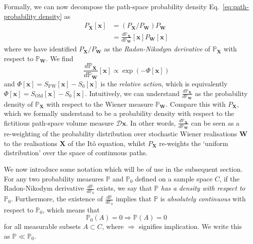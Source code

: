 Formally, we can now decompose the path-space probability density Eq.~\ref{eq:path-probability density} as
\begin{equation}
\begin{aligned}
P_\mathbf{X}[\mathbf{x}] & = (P_\mathbf{X} / P_\mathbf{W}) P_\mathbf{W}   \\
 & = \frac{d \mathbb{P}_\mathbf{X}}{d \mathbb{P}_\mathbf{W}}[\mathbf{x}] P_\mathbf{W}[\mathbf{x}]
\end{aligned}
\end{equation}
where we have identified $P_\mathbf{X} / P_\mathbf{W}$ as the \textit{Radon-Nikodym derivative} of $\mathbb{P}_\mathbf{X}$ with respect to $\mathbb{P}_\mathbf{W}$. We find
\begin{equation} \label{eq:radon-nikodym derivative of Px}
\frac{d \mathbb{P}_\mathbf{X}}{d \mathbb{P}_\mathbf{W}}[\mathbf{x}] \propto \exp ( -\Phi[\mathbf{x}] )
\end{equation}
and $\Phi[\mathbf{x}] = S_\text{FW}[\mathbf{x}] - S_0[\mathbf{x}]$ is the \textit{relative action}, which is equivalently $\Phi[\mathbf{x}] = S_\text{OM}[\mathbf{x}] - S_0[\mathbf{x}]$. Intuitively, we can understand $\frac{d \mathbb{P}_\mathbf{X}}{d \mathbb{P}_\mathbf{W}}$ as the probability density of $\mathbb{P}_\mathbf{X}$ with respect to the Wiener measure $\mathbb{P}_\mathbf{W}$. Compare this with $P_\mathbf{X}$, which we formally understand to be a probability density with respect to the fictitious path-space volume measure $\mathcal{D} \mathbf{x}$. In other words, $\frac{d \mathbb{P}_\mathbf{X}}{d \mathbb{P}_\mathbf{W}}$ can be seen as a re-weighting of the probability distribution over stochastic Wiener realisations $\mathbf{W}$ to the realisations $\mathbf{X}$ of the It\^{o} equation, whilst $P_\mathbf{X}$ re-weights the `uniform distribution' over the space of continuous paths.

We now introduce some notation which will be of use in the subsequent section. For any two probability measures $\mathbb{P}$ and $\mathbb{P}_0$ defined on a sample space $C$, if the Radon-Nikodym derivative $\frac{d \mathbb{P}}{d \mathbb{P}_0}$ exists, we say that \textit{$\mathbb{P}$ has a density with respect to $\mathbb{P}_0$}. Furthermore, the existence of $\frac{d \mathbb{P}}{d \mathbb{P}_0}$ implies that $\mathbb{P}$ is \textit{absolutely continuous} with respect to $\mathbb{P}_0$, which means that
\begin{equation} \label{eq:absolute continuity}
	\mathbb{P}_0(A) = 0 \Rightarrow \mathbb{P}(A) = 0
\end{equation}
for all measurable subsets $A \subset C$, where $\Rightarrow$ signifies implication. We write this as $\mathbb{P} \ll \mathbb{P}_0$.

